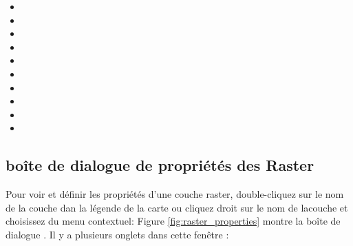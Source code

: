 \begin{itemize}
\item {}
\item {}
\item {}
\item {}
\item {}
\item {}
\item {}
\item {}
\item {}
\item {}
\end{itemize}

\subsection{bo\^ite de dialogue de propri\'et\'es des Raster}\label{label_rasterprop}

Pour voir et d\'efinir les propri\'et\'es d'une couche raster, double-cliquez sur le
nom de la couche dan la l\'egende de la carte ou cliquez droit sur le nom de
lacouche et choisissez  du menu
contextuel:  Figure
\ref{fig:raster_properties} montre la bo\^ite de dialogue . Il y a plusieurs onglets dans cette fen\^etre :

